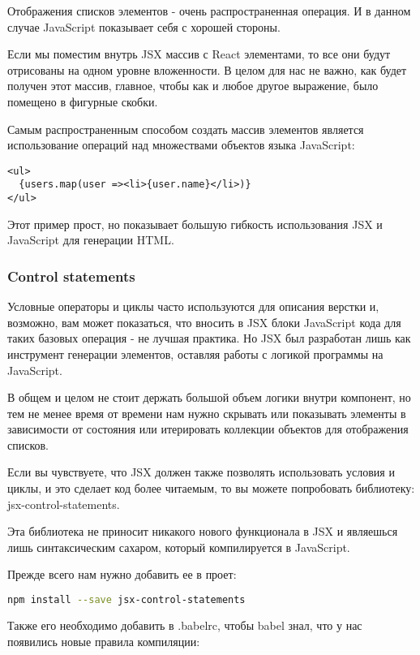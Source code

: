 Отображения списков элементов - очень распространенная операция. И в данном случае JavaScript показывает себя с хорошей стороны.

Если мы поместим внутрь JSX массив с React элементами, то все они будут отрисованы на одном уровне вложенности. В целом для нас не важно, как будет получен этот массив, главное, чтобы как и любое другое выражение, было помещено в фигурные скобки.

Самым распространенным способом создать массив элементов является использование операций над множествами объектов языка JavaScript:

\begin{lstlisting}
<ul>
  {users.map(user =><li>{user.name}</li>)}
</ul>
\end{lstlisting}

Этот пример прост, но показывает большую гибкость использования JSX и JavaScript для генерации HTML.

\subsubsection{Control statements}

Условные операторы и циклы часто используются для описания верстки и, возможно, вам может показаться, что вносить в JSX блоки JavaScript кода для таких базовых операция - не лучшая практика. Но JSX был разработан лишь как инструмент генерации элементов, оставляя работы с логикой программы на JavaScript.

В общем и целом не стоит держать большой объем логики внутри компонент, но тем не менее время от времени нам нужно скрывать или показывать элементы в зависимости от состояния или итерировать коллекции объектов для отображения списков. 

Если вы чувствуете, что JSX должен также позволять использовать условия и циклы, и это сделает код более читаемым, то вы можете попробовать библиотеку: jsx-control-statements.

Эта библиотека не приносит никакого нового функционала в JSX и являешься лишь синтаксическим сахаром, который компилируется в JavaScript.

Прежде всего нам нужно добавить ее в проет:

\begin{lstlisting}[language=bash]
npm install --save jsx-control-statements
\end{lstlisting}

Также его необходимо добавить в .babelrc, чтобы babel знал, что у нас появились новые правила компиляции:

